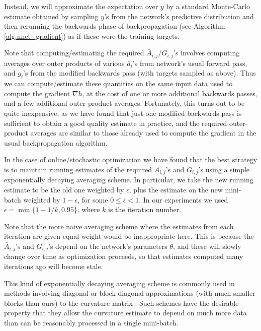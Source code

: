 \documentclass[12pt]{article}
\begin{document}
Instead, we will approximate the expectation over $y$ by a standard Monte-Carlo estimate obtained by sampling $y$'s from the network's predictive distribution and then rerunning the backwards phase of backpropagation (see Algorithm \ref{alg:nnet_gradient}) as if these were the training targets.  

Note that computing/estimating the required $\bar{A}_{i,j}$/$G_{i,j}$'s involves computing averages over outer products of various $\bar{a}_i$'s from network's usual forward pass, and $g_i$'s from the modified backwards pass (with targets sampled as above).  Thus we can compute/estimate these quantities on the same input data used to compute the gradient $\nabla h$, at the cost of one or more additional backwards passes, and a few additional outer-product averages.  Fortunately, this turns out to be quite inexpensive, as we have found that just one modified backwards pass is sufficient to obtain a good quality estimate in practice, and the required outer-product averages are similar to those already used to compute the gradient in the usual backpropagation algorithm.  %

In the case of online/stochastic optimization we have found that the best strategy is to maintain running estimates of the required $\bar{A}_{i,j}$'s and $G_{i,j}$'s using a simple exponentially decaying averaging scheme.  In particular, we take the new running estimate to be the old one weighted by $\epsilon$, plus the estimate on the new mini-batch weighted by $1-\epsilon$, for some $0 \leq \epsilon < 1$.  In our experiments we used $\epsilon = \min\{ 1-1/k, 0.95\}$, where $k$ is the iteration number.

Note that the more naive averaging scheme where the estimates from each iteration are given equal weight would be inappropriate here.  This is because the $\bar{A}_{i,j}$'s and $G_{i,j}$'s depend on the network's parameters $\theta$, and these will slowly change over time as optimization proceeds, so that estimates computed many iterations ago will become stale.%

This kind of exponentially decaying averaging scheme is commonly used in methods involving diagonal or block-diagonal approximations (with much smaller blocks than ours) to the curvature matrix \citep[e.g.][]{lecun_tricks,ng_adaptive, pesky}.  Such schemes have the desirable property that they allow the curvature estimate to depend on much more data than can be reasonably processed in a single mini-batch.  
\end{document}
